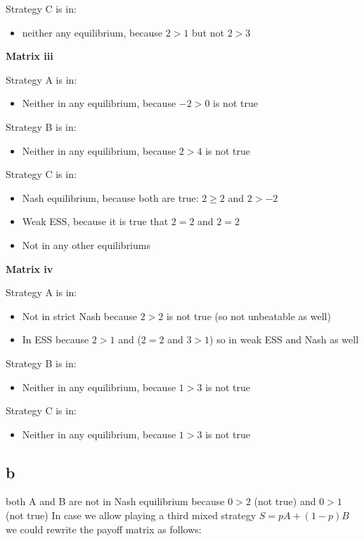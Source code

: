 Strategy C is in:
\begin{itemize}
\item neither any equilibrium, because  $2>1$ but not $2>3$
\end{itemize}

\textbf{Matrix iii}

Strategy A is in:
\begin{itemize}
\item Neither in any equilibrium, because $-2 > 0$ is not true
\end{itemize}

Strategy B is in:
\begin{itemize}
 \item Neither in any equilibrium, because $2>4$ is not true
\end{itemize}

Strategy C is in:
\begin{itemize}
\item Nash equilibrium, because both are true: $2\geq 2$ and $2>-2$
\item Weak ESS, because it is true that  $2=2$ and $2=2$
\item Not in any other equilibriums
\end{itemize}

\textbf{Matrix iv}

Strategy A is in:
\begin{itemize}
\item Not in strict Nash because $2>2$ is not true (so not unbeatable as well)
\item In ESS because $2>1$ and ($2=2$ and $3>1$) so in weak ESS and Nash as well
\end{itemize}

Strategy B is in:
\begin{itemize}
\item Neither in any equilibrium, because  $1>3$ is not true
\end{itemize}

Strategy C is in:
\begin{itemize}
\item Neither in any equilibrium, because $1>3$ is not true
\end{itemize}

\subsection{b}

both A and B are not in Nash equilibrium because $0>2$ (not true) and $0>1$ (not true)
In case we allow playing a third mixed strategy $S=pA+(1-p)B$ we could rewrite the payoff matrix as follows:

